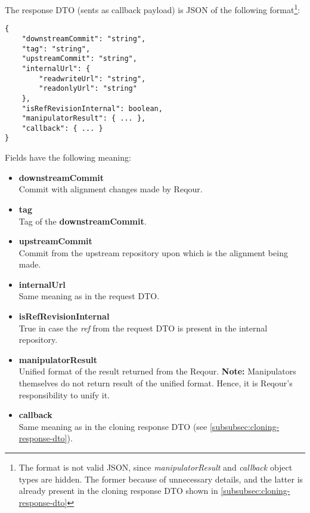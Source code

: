 \documentclass[../main.tex]{subfiles}
\begin{document}
The response DTO (sents as callback payload) is JSON of the following format\footnote{The format is not valid JSON, since \textit{manipulatorResult} and \textit{callback} object types are hidden. The former because of unnecessary details, and the latter is already present in the cloning response DTO shown in \ref{subsubsec:cloning-response-dto}}:

\begin{lstlisting}[numbers=none]
{
    "downstreamCommit": "string",
    "tag": "string",
    "upstreamCommit": "string",
    "internalUrl": {
        "readwriteUrl": "string",
        "readonlyUrl": "string"
    },
    "isRefRevisionInternal": boolean,
    "manipulatorResult": { ... },
    "callback": { ... }
}
\end{lstlisting}

Fields have the following meaning:
\begin{itemize}
    \item \textbf{downstreamCommit}\\
    Commit with alignment changes made by Reqour.

    \item \textbf{tag}\\
    Tag of the \textbf{downstreamCommit}.

    \item \textbf{upstreamCommit}\\
    Commit from the upstream repository upon which is the alignment being made.
    
    \item \textbf{internalUrl}\\
    Same meaning as in the request DTO.

    \item \textbf{isRefRevisionInternal}\\
    True in case the \textit{ref} from the request DTO is present in the internal repository.

    \item \textbf{manipulatorResult}\\
    Unified format of the result returned from the Reqour.
    \textbf{Note:} Manipulators themselves do not return result of the unified format. Hence, it is Reqour's responsibility to unify it.

    \item \textbf{callback}\\
    Same meaning as in the cloning response DTO (see \ref{subsubsec:cloning-response-dto}).
\end{itemize}
\end{document}
